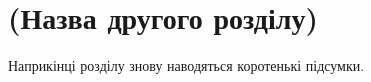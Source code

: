 \chapter{(Назва другого розділу)}
\label{chap:theory}







\chapconclude{\ref{chap:theory}}

Наприкінці розділу знову наводяться коротенькі підсумки.